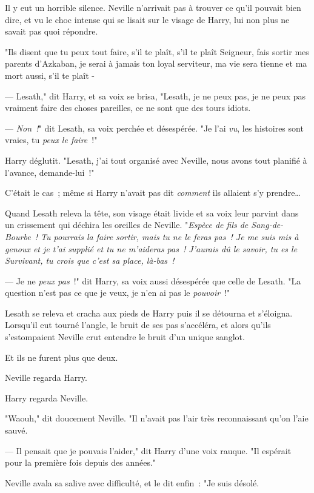Il y eut un horrible silence. Neville n'arrivait pas à trouver ce qu'il pouvait bien dire, et vu le choc intense qui se lisait sur le visage de Harry, lui non plus ne savait pas quoi répondre.

"Ils disent que tu peux tout faire, s'il te plaît, s'il te plaît Seigneur, fais sortir mes parents d'Azkaban, je serai à jamais ton loyal serviteur, ma vie sera tienne et ma mort aussi, s'il te plaît -

--- Lesath," dit Harry, et sa voix se brisa, "Lesath, je ne peux pas, je ne peux pas vraiment faire des choses pareilles, ce ne sont que des tours idiots.

--- \emph{Non~!}" dit Lesath, sa voix perchée et désespérée. "Je l'ai \emph{vu}, les histoires sont vraies, tu \emph{peux le faire}~!"

Harry déglutit. "Lesath, j'ai tout organisé avec Neville, nous avons tout planifié à l'avance, demande-lui~!"

C'était le cas~; même si Harry n'avait pas dit \emph{comment} ils allaient s'y prendre…

Quand Lesath releva la tête, son visage était livide et sa voix leur parvint dans un crissement qui déchira les oreilles de Neville. "\emph{Espèce de fils de Sang-de-Bourbe~! Tu pourrais la faire sortir, mais tu ne le feras pas~! Je me suis mis à genoux et je t'ai supplié et tu ne m'aideras pas~! J'aurais dû le savoir, tu es le Survivant, tu crois que c'est sa place, là-bas~!}

--- Je ne \emph{peux pas}~!" dit Harry, sa voix aussi désespérée que celle de Lesath. "La question n'est pas ce que je veux, je n'en ai pas le \emph{pouvoir}~!"

Lesath se releva et cracha aux pieds de Harry puis il se détourna et s'éloigna. Lorsqu'il eut tourné l'angle, le bruit de ses pas s'accéléra, et alors qu'ils s'estompaient Neville crut entendre le bruit d'un unique sanglot.

Et ils ne furent plus que deux.

Neville regarda Harry.

Harry regarda Neville.

"Waouh," dit doucement Neville. "Il n'avait pas l'air très reconnaissant qu'on l'aie sauvé.

--- Il pensait que je pouvais l'aider," dit Harry d'une voix rauque. "Il espérait pour la première fois depuis des années."

Neville avala sa salive avec difficulté, et le dit enfin~: "Je suis désolé.

